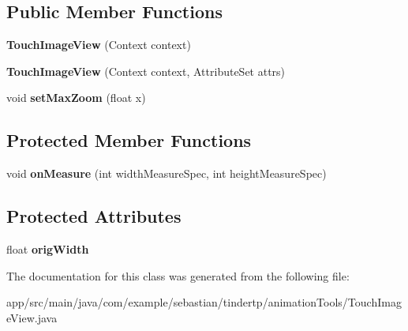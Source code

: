 \subsection*{Public Member Functions}
\begin{DoxyCompactItemize}
\item 
{\bfseries Touch\+Image\+View} (Context context)\hypertarget{classcom_1_1example_1_1sebastian_1_1tindertp_1_1animationTools_1_1TouchImageView_a6f8ac0d2ac5d94b422fced31970a9cb9}{}\label{classcom_1_1example_1_1sebastian_1_1tindertp_1_1animationTools_1_1TouchImageView_a6f8ac0d2ac5d94b422fced31970a9cb9}

\item 
{\bfseries Touch\+Image\+View} (Context context, Attribute\+Set attrs)\hypertarget{classcom_1_1example_1_1sebastian_1_1tindertp_1_1animationTools_1_1TouchImageView_a389cf4d858cee8d2c06d3cca1e7b94bc}{}\label{classcom_1_1example_1_1sebastian_1_1tindertp_1_1animationTools_1_1TouchImageView_a389cf4d858cee8d2c06d3cca1e7b94bc}

\item 
void {\bfseries set\+Max\+Zoom} (float x)\hypertarget{classcom_1_1example_1_1sebastian_1_1tindertp_1_1animationTools_1_1TouchImageView_a0b69c26cbc0175a47dbf68f30e7d4a3e}{}\label{classcom_1_1example_1_1sebastian_1_1tindertp_1_1animationTools_1_1TouchImageView_a0b69c26cbc0175a47dbf68f30e7d4a3e}

\end{DoxyCompactItemize}
\subsection*{Protected Member Functions}
\begin{DoxyCompactItemize}
\item 
void {\bfseries on\+Measure} (int width\+Measure\+Spec, int height\+Measure\+Spec)\hypertarget{classcom_1_1example_1_1sebastian_1_1tindertp_1_1animationTools_1_1TouchImageView_a8f4299045b983fb012a47f97998cd260}{}\label{classcom_1_1example_1_1sebastian_1_1tindertp_1_1animationTools_1_1TouchImageView_a8f4299045b983fb012a47f97998cd260}

\end{DoxyCompactItemize}
\subsection*{Protected Attributes}
\begin{DoxyCompactItemize}
\item 
float {\bfseries orig\+Width}\hypertarget{classcom_1_1example_1_1sebastian_1_1tindertp_1_1animationTools_1_1TouchImageView_a937d2ced1463ba624c1630e8ee08256f}{}\label{classcom_1_1example_1_1sebastian_1_1tindertp_1_1animationTools_1_1TouchImageView_a937d2ced1463ba624c1630e8ee08256f}

\end{DoxyCompactItemize}


The documentation for this class was generated from the following file\+:\begin{DoxyCompactItemize}
\item 
app/src/main/java/com/example/sebastian/tindertp/animation\+Tools/Touch\+Image\+View.\+java\end{DoxyCompactItemize}
